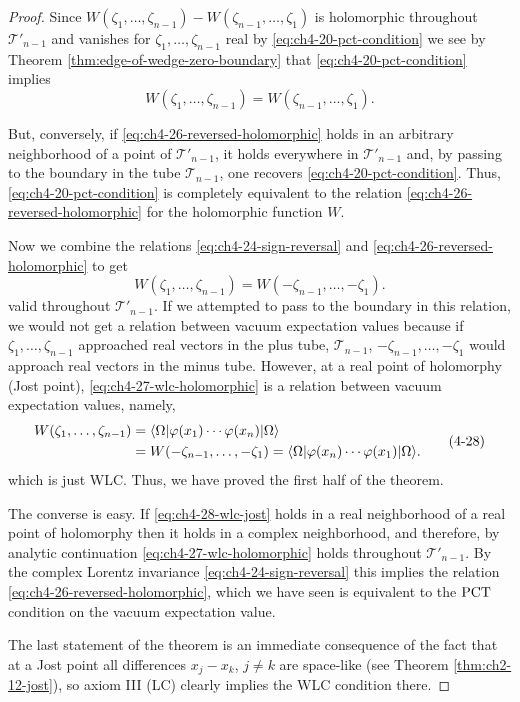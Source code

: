 \begin{proof}
Since $W(\zeta_1,\ldots,\zeta_{n-1})-W(\zeta_{n-1},\ldots,\zeta_1)$ is holomorphic
throughout $\mathcal{T}'_{n-1}$ and vanishes for
$\zeta_1,\ldots,\zeta_{n-1}$ real by \eqref{eq:ch4-20-pct-condition} we see by Theorem \ref{thm:edge-of-wedge-zero-boundary} that \eqref{eq:ch4-20-pct-condition}
implies
\begin{equation}
  W(\zeta_1,\ldots,\zeta_{n-1})
  =W(\zeta_{n-1},\ldots,\zeta_1).
  \tag{4-26}\label{eq:ch4-26-reversed-holomorphic}
\end{equation}

But, conversely, if \eqref{eq:ch4-26-reversed-holomorphic} holds in an arbitrary neighborhood of a point of
$\mathcal{T}'_{n-1}$, it holds everywhere in $\mathcal{T}'_{n-1}$ and, by
passing to the boundary in the tube $\mathcal{T}_{n-1}$, one recovers \eqref{eq:ch4-20-pct-condition}.
Thus, \eqref{eq:ch4-20-pct-condition} is completely equivalent to the relation \eqref{eq:ch4-26-reversed-holomorphic} for the
holomorphic function $W$.

Now we combine the relations \eqref{eq:ch4-24-sign-reversal} and \eqref{eq:ch4-26-reversed-holomorphic} to get
\begin{equation}
  W(\zeta_1,\ldots,\zeta_{n-1})
  =W(-\zeta_{n-1},\ldots,-\zeta_1).
  \tag{4-27}\label{eq:ch4-27-wlc-holomorphic}
\end{equation}
valid throughout $\mathcal{T}'_{n-1}$. If we attempted to pass to the boundary
in this relation, we would not get a relation between vacuum expectation
values because if $\zeta_1,\ldots,\zeta_{n-1}$ approached real vectors in the
plus tube, $\mathcal{T}_{n-1}$, $-\zeta_{n-1},\ldots,-\zeta_1$ would approach
real vectors in the minus tube. However, at a real point of holomorphy (Jost
point), \eqref{eq:ch4-27-wlc-holomorphic} is a relation between vacuum expectation values, namely,
\begin{equation}
\begin{aligned}
  W(\zeta_1,\ldots,\zeta_{n-1})
  &=\langle \Omega\rvert\varphi(x_1)\cdots\varphi(x_n)\lvert \Omega\rangle \\
  &=W(-\zeta_{n-1},\ldots,-\zeta_1)
    =\langle \Omega\rvert\varphi(x_n)\cdots\varphi(x_1)\lvert \Omega\rangle.
\end{aligned}
\tag{4-28}\label{eq:ch4-28-wlc-jost}
\end{equation}
which is just WLC. Thus, we have proved the first half of the theorem.

The converse is easy. If \eqref{eq:ch4-28-wlc-jost} holds in a real neighborhood of a real point
of holomorphy then it holds in a complex neighborhood, and therefore, by
analytic continuation \eqref{eq:ch4-27-wlc-holomorphic} holds throughout $\mathcal{T}'_{n-1}$. By the
complex Lorentz invariance \eqref{eq:ch4-24-sign-reversal} this implies the relation \eqref{eq:ch4-26-reversed-holomorphic}, which we
have seen is equivalent to the $\mathrm{PCT}$ condition on the vacuum expectation
value.

The last statement of the theorem is an immediate consequence of the fact that
at a Jost point all differences $x_j-x_k$, $j\ne k$ are space-like (see
Theorem \ref{thm:ch2-12-jost}), so axiom III (LC) clearly implies the WLC condition there.
\end{proof}

